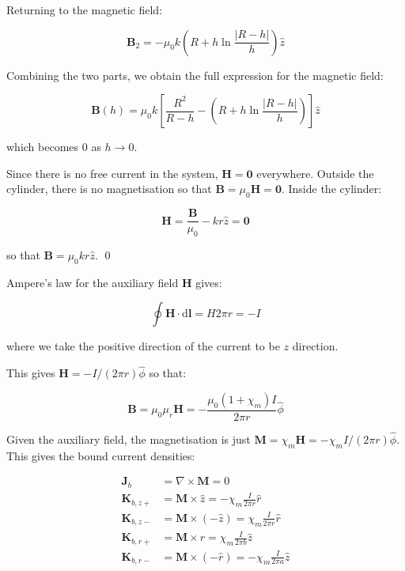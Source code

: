 \documentclass[12pt]{article}
\begin{document}
Returning to the magnetic field:

\begin{equation}
    \mathbf{B}_{2} = -\mu_{0}k \left( R + h \ln{\frac{\left\lvert R-h \right\rvert}{h}} \right) \hat{z}
\end{equation}

Combining the two parts, we obtain the full expression for the magnetic field:

\begin{equation}
    \mathbf{B}(h) = \mu_{0}k \left[ \frac{R^{2}}{R-h} - \left( R + h \ln{\frac{\left\lvert R-h \right\rvert}{h}} \right) \right] \hat{z}
\end{equation}

which becomes $0$ as $h \to 0$.

Since there is no free current in the system, $\mathbf{H} = \mathbf{0}$ everywhere. Outside the cylinder, there is no magnetisation so that $\mathbf{B} = \mu_{0} \mathbf{H} = \mathbf{0}$. Inside the cylinder:

\begin{equation}
    \mathbf{H} = \frac{\mathbf{B}}{\mu_{0}} - kr \hat{z} = \mathbf{0}
\end{equation}

so that $\mathbf{B} = \mu_{0} kr \hat{z}$.
\qed


Ampere's law for the auxiliary field $\mathbf{H}$ gives:

\begin{equation}
    \oint \mathbf{H} \cdot \mathrm{d}\mathbf{l} = H 2\pi r = -I
\end{equation}

where we take the positive direction of the current to be $z$ direction. 

This gives $\mathbf{H} = -I/(2\pi r) \hat{\phi}$ so that:

\begin{equation}
    \mathbf{B} = \mu_{0} \mu_{r} \mathbf{H} = -\frac{\mu_{0} (1 + \chi_{m}) I}{2\pi r} \hat{\phi}
\end{equation}

Given the auxiliary field, the magnetisation is just $\mathbf{M} = \chi_{m} \mathbf{H} = -\chi_{m} I/(2\pi r) \hat{\phi}$. This gives the bound current densities:

\begin{equation}
\begin{split}
    \mathbf{J}_{b} &= \nabla \times \mathbf{M} = 0 \\
    \mathbf{K}_{b,z+} &= \mathbf{M} \times \hat{z} = -\chi_{m} \frac{I}{2\pi r} \hat{r} \\
    \mathbf{K}_{b,z-} &= \mathbf{M} \times (-\hat{z}) = \chi_{m} \frac{I}{2\pi r} \hat{r} \\
    \mathbf{K}_{b,r+} &= \mathbf{M} \times \hat{r} = \chi_{m} \frac{I}{2\pi b} \hat{z} \\
    \mathbf{K}_{b,r-} &= \mathbf{M} \times (-\hat{r}) = -\chi_{m} \frac{I}{2\pi a} \hat{z}
\end{split}
\end{equation}
\end{document}
